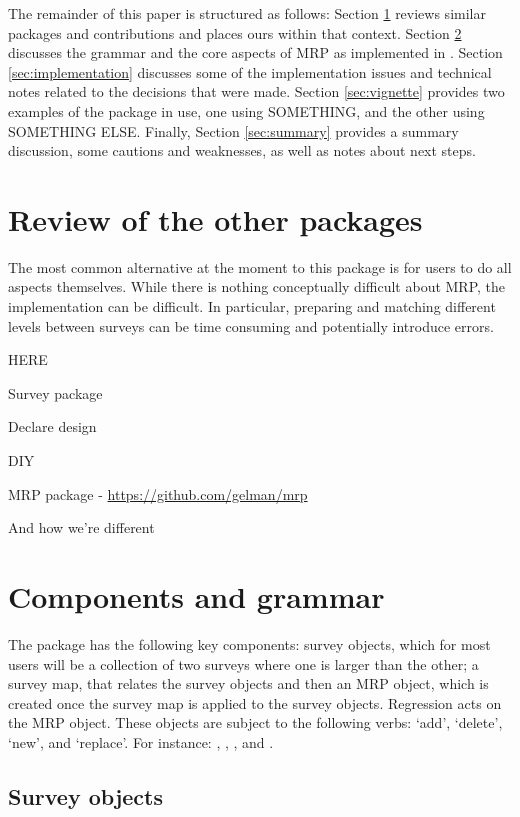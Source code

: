 \documentclass[
]{jss}
\begin{document}
The remainder of this paper is structured as follows: Section
\ref{sec:review} reviews similar packages and contributions and places
ours within that context. Section \ref{sec:components} discusses the
grammar and the core aspects of MRP as implemented in .
Section \ref{sec:implementation} discusses some of the implementation
issues and technical notes related to the decisions that were made.
Section \ref{sec:vignette} provides two examples of the package in use,
one using SOMETHING, and the other using SOMETHING ELSE. Finally,
Section \ref{sec:summary} provides a summary discussion, some cautions
and weaknesses, as well as notes about next steps.

\section{Review of the other packages} \label{sec:review}

The most common alternative at the moment to this package is for users
to do all aspects themselves. While there is nothing conceptually
difficult about MRP, the implementation can be difficult. In particular,
preparing and matching different levels between surveys can be time
consuming and potentially introduce errors.

HERE

Survey package

Declare design

DIY

MRP package - \url{https://github.com/gelman/mrp}

And how we're different

\section{Components and grammar} \label{sec:components}

The  package has the following key components: survey
objects, which for most users will be a collection of two surveys where
one is larger than the other; a survey map, that relates the survey
objects and then an MRP object, which is created once the survey map is
applied to the survey objects. Regression acts on the MRP object. These
objects are subject to the following verbs: `add', `delete', `new', and
`replace'. For instance: ,
, , and
.

\subsection*{Survey objects}
\end{document}
